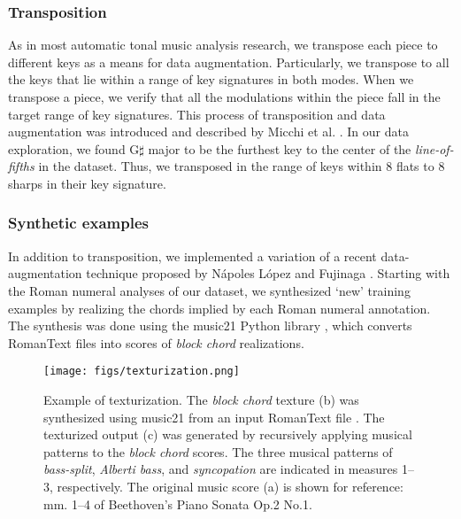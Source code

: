 \documentclass{article}
\newcommand{\guide}[1]{}
\begin{document}
\subsubsection{Transposition}

As in most automatic tonal music analysis research, we transpose each piece to different keys as a means for data augmentation. 
Particularly, we transpose to all the keys that lie within a range of key signatures in both modes.
When we transpose a piece, we verify that all the modulations within the piece fall in the target range of key signatures.
This process of transposition and data augmentation was introduced and described by Micchi et al. \cite{micchi_not_2020}.
In our data exploration, we found G$\sharp$ major to be the furthest key to the center of the \emph{line-of-fifths} \cite{temperley_line_2000} in the dataset. 
Thus, we transposed in the range of keys within 8 flats to 8 sharps in their key signature.

\subsubsection{Synthetic examples}

\guide{Additional data augmentation.}
In addition to transposition, we implemented a variation of a recent data-augmentation technique proposed by N\'apoles L\'opez and Fujinaga \cite{napoles_lopez_harmonic_2020}.
Starting with the Roman numeral analyses of our dataset, we synthesized `new' training examples by realizing the chords implied by each Roman numeral annotation.
The synthesis was done using the music21 Python library \cite{cuthbert_music21_2010}, which converts RomanText \cite{gotham_romantext_2019} files into scores of \emph{block chord} realizations.

\begin{figure}
 \centerline{
 \texttt{[image: figs/texturization.png]}}
 \caption{Example of texturization. The \emph{block chord} texture (b) was synthesized using music21 \cite{cuthbert_music21_2010} from an input RomanText file \cite{gotham_romantext_2019}. The texturized output (c) was generated by recursively applying musical patterns to the \emph{block chord} scores. The three musical patterns of \emph{bass-split}, \emph{Alberti bass}, and \emph{syncopation} are indicated in measures 1--3, respectively. The original music score (a) is shown for reference: mm. 1--4 of Beethoven's Piano Sonata Op.2 No.1.}
 \label{fig:texturization}
\end{figure}
\end{document}
